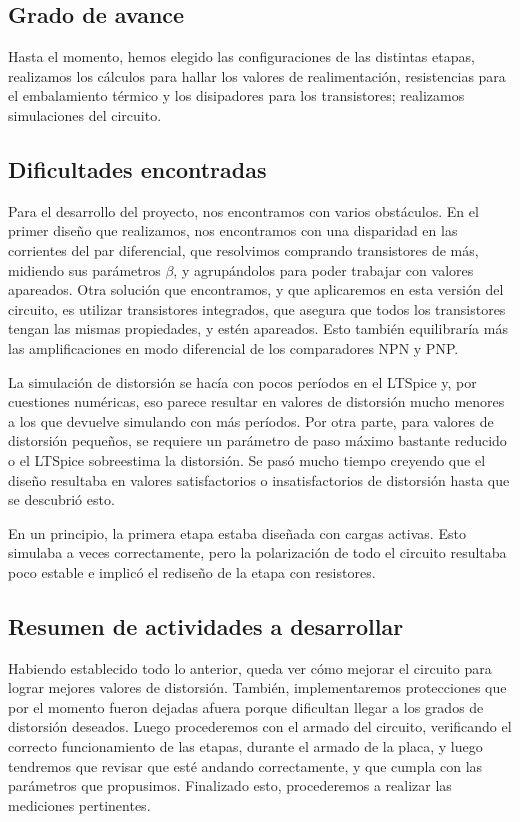 

\subsection{Grado de avance}

Hasta el momento, hemos elegido las configuraciones de las distintas etapas, realizamos los cálculos para hallar los valores de realimentación, resistencias para el embalamiento térmico y los disipadores para los transistores; realizamos simulaciones del circuito.

\subsection{Dificultades encontradas}


Para el desarrollo del proyecto, nos encontramos con varios obstáculos. En el primer diseño que realizamos, nos encontramos con una disparidad en las corrientes del par diferencial, que resolvimos comprando transistores de más, midiendo sus parámetros $\beta$, y agrupándolos para poder trabajar con valores apareados. Otra solución que encontramos, y que aplicaremos en esta versión del circuito, es utilizar transistores integrados, que asegura que todos los transistores tengan las mismas propiedades, y estén apareados. Esto también equilibraría más las amplificaciones en modo diferencial de los comparadores NPN y PNP.

La simulación de distorsión se hacía con pocos períodos en el LTSpice y, por cuestiones numéricas, eso parece resultar en valores de distorsión mucho menores a los que devuelve simulando con más períodos. Por otra parte, para valores de distorsión pequeños, se requiere un parámetro de paso máximo bastante reducido o el LTSpice sobreestima la distorsión. Se pasó mucho tiempo creyendo que el diseño resultaba en valores satisfactorios o insatisfactorios de distorsión hasta que se descubrió esto.

En un principio, la primera etapa estaba diseñada con cargas activas. Esto simulaba a veces correctamente, pero la polarización de todo el circuito resultaba poco estable e implicó el rediseño de la etapa con resistores.


\subsection{Resumen de actividades a desarrollar}

Habiendo establecido todo lo anterior, queda ver cómo mejorar el circuito para lograr mejores valores de distorsión. También, implementaremos protecciones que por el momento fueron dejadas afuera porque dificultan llegar a los grados de distorsión deseados. Luego procederemos con el armado del circuito, verificando el correcto funcionamiento de las etapas, durante el armado de la placa, y luego tendremos que revisar que esté andando correctamente, y que cumpla con las parámetros que propusimos. Finalizado esto, procederemos a realizar las mediciones pertinentes.

